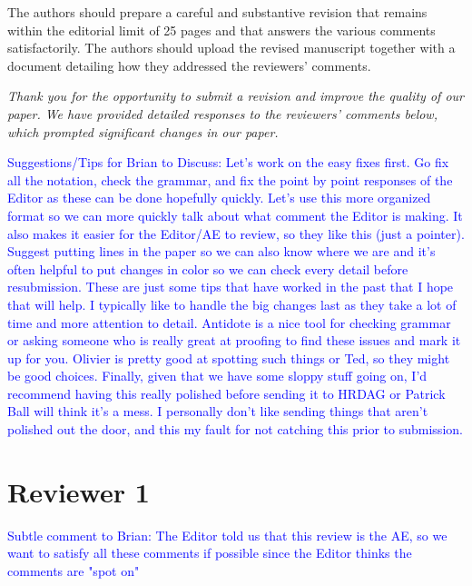 \documentclass[letterpaper, parskip]{scrartcl}
\newcounter{responsectr}[section]     %
\newcommand{\reply}[1]{%
	\refstepcounter{responsectr}%
		\begin{tcolorbox}
			\itshape #1
		\end{tcolorbox}
}
\begin{document}
	The authors should prepare a careful and substantive revision that remains within the editorial limit of 25 pages and that answers the various comments satisfactorily.  The authors should upload the revised manuscript together with a document detailing how they addressed the reviewers’ comments.
	

	\reply{%
		Thank you for the opportunity to submit a revision and improve the quality of our paper. 
		We have provided detailed responses to the reviewers' comments below, 
		which prompted significant changes in our paper.
	}
	

\textcolor{blue}{Suggestions/Tips for Brian to Discuss: Let's work on the easy fixes first. Go fix all the notation, check the grammar, and fix the point by point responses of the Editor as these can be done hopefully quickly. Let's use this more organized format so we can more quickly talk about what comment the Editor is making. It also makes it easier for the Editor/AE to review, so they like this (just a pointer). Suggest putting lines in the paper so we can also know where we are and it's often helpful to put changes in color so we can check every detail before resubmission. These are just some tips that have worked in the past that I hope that will help. I typically like to handle the big changes last as they take a lot of time and more attention to detail. Antidote is a nice tool for checking grammar or asking someone who is really great at proofing to find these issues and mark it up for you. Olivier is pretty good at spotting such things or Ted, so they might be good choices. Finally, given that we have some sloppy stuff going on, I'd recommend having this really polished before sending it to HRDAG or Patrick Ball will think it's a mess. I personally don't like sending things that aren't polished out the door, and this my fault for not catching this prior to submission.}
	
	\clearpage
	\newpage
	
	\section*{Reviewer 1}

\textcolor{blue}{Subtle comment to Brian: The Editor told us that this review is the AE, so we want to satisfy all these comments if possible since the Editor thinks the comments are "spot on"}


	\setcounter{responsectr}{0}
	
\end{document}
